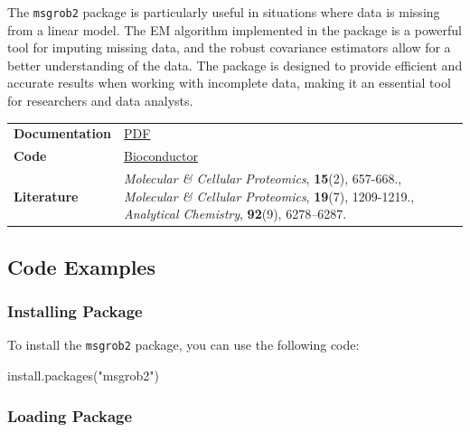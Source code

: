 \documentclass[
]{book}
\newenvironment{Shaded}{\begin{snugshade}}{\end{snugshade}}
\newcommand{\FunctionTok}[1]{\textcolor[rgb]{0.00,0.00,0.00}{#1}}
\newcommand{\NormalTok}[1]{#1}
\newcommand{\StringTok}[1]{\textcolor[rgb]{0.31,0.60,0.02}{#1}}
\begin{document}
The \texttt{msgrob2} package is particularly useful in situations where data is missing from a linear model. The EM algorithm implemented in the package is a powerful tool for imputing missing data, and the robust covariance estimators allow for a better understanding of the data. The package is designed to provide efficient and accurate results when working with incomplete data, making it an essential tool for researchers and data analysts.

\begin{longtable}[]{@{}
  >{\raggedright\arraybackslash}p{}
  >{\raggedright\arraybackslash}p{}@{}}
\toprule\noalign{}
\endhead
\bottomrule\noalign{}
\endlastfoot
\textbf{Documentation} & \href{https://www.bioconductor.org/packages/release/bioc/manuals/msqrob2/man/msqrob2.pdf}{PDF} \\
\textbf{Code} & \href{https://www.bioconductor.org/packages/release/bioc/html/msqrob2.html}{Bioconductor} \\
\textbf{Literature} & \emph{Molecular \& Cellular Proteomics}, \textbf{15}(2), 657-668., \emph{Molecular \& Cellular Proteomics}, \textbf{19}(7), 1209-1219., \emph{Analytical Chemistry}, \textbf{92}(9), 6278--6287. \\
\end{longtable}

\hypertarget{code-examples}{%
\subsection{Code Examples}\label{code-examples}}

\hypertarget{installing-package}{%
\subsubsection{Installing Package}\label{installing-package}}

To install the \texttt{msgrob2} package, you can use the following code:

\begin{Shaded}
\begin{Highlighting}[]
\FunctionTok{install.packages}\NormalTok{(}\StringTok{"msgrob2"}\NormalTok{)}
\end{Highlighting}
\end{Shaded}

\hypertarget{loading-package}{%
\subsubsection{Loading Package}\label{loading-package}}
\end{document}
